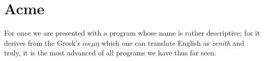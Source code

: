 \documentclass[a4paper,12pt]{report}
\begin{document}
      \section*{Acme}

        For once we are presented with a program whose name is rather descriptive; for it derives from the Greek's \textit{$\alpha$$\kappa$$\mu$$\eta$} which one can translate English as \textit{zenith} and truly, it is the most advanced of all programs we have thus far seen.
\end{document}

